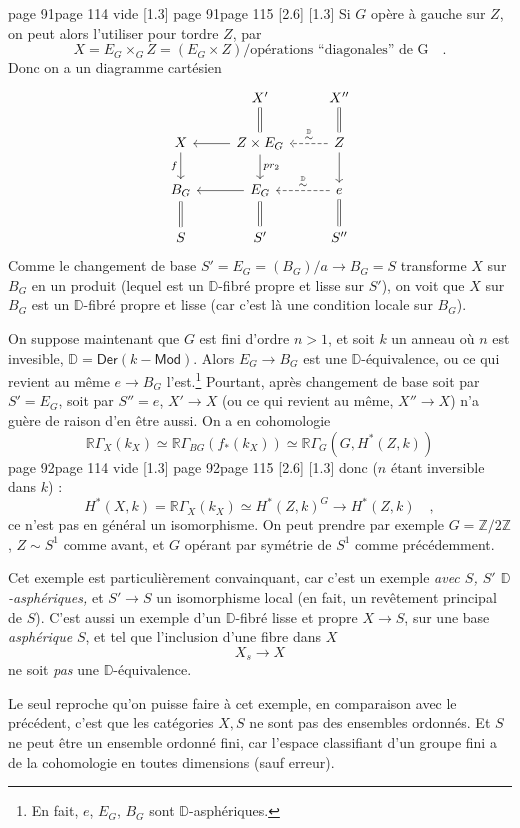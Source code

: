 \documentclass[11pt,leqno]{article}
\newcommand{\printedpage}[1]{\marginnote{\scriptsize\sffamily ed.\ #1}}
\newcommand{\msp}[1]{%
  \begingroup\def\thismsp{#1}\def\blankmsp{page 114 vide}%
  \ifx\thismsp\blankmsp
    \marginnote{\scriptsize\sffamily [114: vide]}[1.3\baselineskip]%
  \else\def\followingmsp{page 115}%
    \ifx\thismsp\followingmsp
      \marginnote{\scriptsize\sffamily [page 115]}[2.6\baselineskip]%
    \else\marginnote{\scriptsize\sffamily [#1]}[1.3\baselineskip]\fi
  \fi\endgroup}
\newcommand{\D}{\ensuremath{\mathbb{D}}}
\newcommand{\RR}{\ensuremath{\mathbb{R}}}
\begin{document}
\printedpage{56}

\msp{page 91}
Si $G$ opère à gauche sur $Z$, on peut alors l'utiliser pour tordre $Z$, par
\[ X = E_G \times_G Z = (E_G \times Z)/\text{opérations ``diagonales'' de G} \quad . \]
Donc on a un diagramme cartésien
\[
\begin{tikzcd}
 & X' \arrow[d, equal] & X'' \arrow[d, equal] \\
X \arrow[d, "f"'] & Z \times E_G \arrow[l] \arrow[d, "pr_2"] & Z \arrow[l, dashed, "{\overset{\D}{\sim}}"'] \arrow[d] \\
B_G \arrow[d, equal] & E_G \arrow[l] \arrow[d, equal] & e \arrow[l, dashed, "{\overset{\D}{\sim}}"'] \arrow[d, equal] \\
S & S' & S''
\end{tikzcd}
\]
Comme le changement de base $S' = E_G = (B_G)/a \to B_G = S$ transforme $X$ sur $B_G$ en un produit (lequel est un $\D$-fibré propre et lisse sur $S'$), on voit que $X$ sur $B_G$ est un $\D$-fibré propre et lisse (car c'est là une condition locale sur $B_G$).

On suppose maintenant que $G$ est fini d'ordre $n > 1$, et soit $k$ un anneau où $n$ est invesible, $\D = \mathsf{Der}(k - \mathsf{Mod})$. Alors $E_G \to B_G$ est une $\D$-équivalence, ou ce qui revient au même $e \to B_G$ l'est.\footnote[47]{En fait, $e$, $E_G$, $B_G$ sont $\D$-asphériques.} Pourtant, après changement de base soit par $S' = E_G$, soit par $S'' = e$, $X' \to X$ (ou ce qui revient au même, $X'' \to X$) n'a guère de raison d'en être aussi. On a en cohomologie %
\[ \RR\Gamma_X(k_X) \simeq \RR\Gamma_{BG}(f_*(k_X)) \simeq \RR\Gamma_G(G, H^*(Z,k)) \]
\msp{page 92}
donc ($n$ étant inversible dans $k$) :
\[ H^*(X,k) = \RR\Gamma_X(k_X) \simeq H^*(Z,k)^G \longrightarrow H^*(Z,k) \quad , \]
ce n'est pas en général un isomorphisme. On peut prendre par exemple $G = \mathbb{Z}/2\mathbb{Z}$, $Z \sim S^1$ comme avant, et $G$ opérant par symétrie de $S^1$ comme précédemment.

Cet exemple est particulièrement convainquant, car c'est un exemple \textit{avec $S$, $S'$ $\D$-asphériques,} et $S' \to S$ un isomorphisme local (en fait, un revêtement principal de $S$). C'est aussi un exemple d'un $\D$-fibré lisse et propre $X \to S$, sur une base \textit{asphérique} $S$, et tel que l'inclusion d'une fibre dans $X$ %
\[ X_s \longrightarrow X \]
ne soit \textit{pas} une $\D$-équivalence.

Le seul reproche qu'on puisse faire à cet exemple, en comparaison avec le précédent, c'est que les catégories $X, S$ ne sont pas des ensembles ordonnés. Et $S$ ne peut être un ensemble ordonné fini, car l'espace classifiant d'un groupe fini a de la cohomologie en toutes dimensions (sauf erreur).
\end{document}
